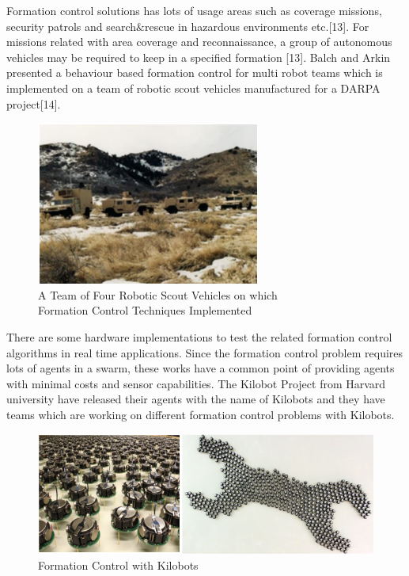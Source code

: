Formation control solutions has lots of usage areas such as coverage missions, security patrols and search$\&$rescue in hazardous environments etc.[13]. For missions related with area coverage and reconnaissance, a group of autonomous vehicles may be required to keep in a specified formation [13].  Balch and Arkin presented a behaviour based formation control for multi robot teams which is implemented on a team of robotic scout vehicles manufactured for a DARPA project[14].

\begin{figure}[H]
\captionsetup{format=hang,justification=centerfirst}
\caption {A Team of Four Robotic Scout Vehicles on which\\
Formation Control Techniques Implemented	}
\centering
\includegraphics[scale = 1]{scout_robots}
\end{figure} 

There are some hardware implementations to test the related formation control algorithms in real time applications. Since the formation control problem requires lots of agents in a swarm, these works have a common point of providing agents with minimal costs and sensor capabilities. The Kilobot Project from Harvard university have released their agents with the name of Kilobots and they have teams which are working on different formation control problems with Kilobots.

\begin{figure}[H]
\caption{Formation Control with Kilobots}
\centering
\includegraphics[scale = 1]{kilobot}
\end{figure}

